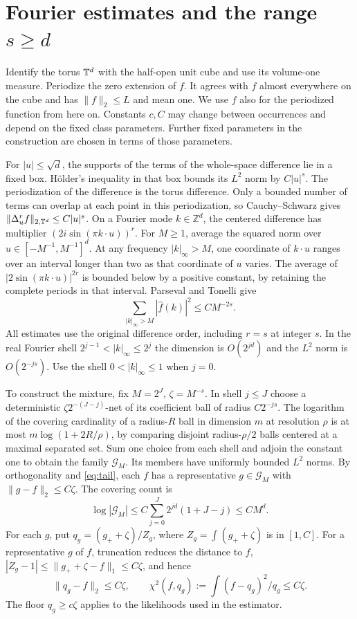 \section{Fourier estimates and the range \texorpdfstring{\(s\ge d\)}{s >= d}}
\label{sec:large-s}

Identify the torus \(\mathbb T^d\) with the half-open unit cube and use
its volume-one measure. Periodize the zero extension of \(f\).
It agrees with \(f\) almost everywhere on the cube and has
\(\|f\|_2\le L\) and mean one. We use \(f\) also for the periodized
function from here on. Constants \(c,C\) may change between
occurrences and depend on the fixed class parameters. Further
fixed parameters in the construction are chosen in terms of those
parameters.

For \(|u|\le\sqrt d\), the supports of the terms of the
whole-space difference lie in a fixed box. Hölder's inequality in
that box bounds its \(L^2\) norm by \(C|u|^s\). The periodization
of the difference is the torus difference. Only a bounded number
of terms can overlap at each point in this periodization, so
Cauchy--Schwarz gives \(\|\Delta_u^r f\|_{2,\mathbb T^d}\le C|u|^s\).
On a Fourier mode \(k\in\mathbb Z^d\), the centered difference
has multiplier \((2i\sin(\pi k\cdot u))^r\). For \(M\ge1\), average
the squared norm over \(u\in[-M^{-1},M^{-1}]^d\). At any
frequency \(|k|_\infty>M\), one coordinate of \(k\cdot u\)
ranges over an interval longer than two as that coordinate of \(u\)
varies. The average of \(|2\sin(\pi k\cdot u)|^{2r}\) is
bounded below by a positive constant, by retaining the complete
periods in that interval. Parseval and Tonelli give
\begin{equation}\label{eq:tail}
   \sum_{|k|_\infty>M} |\widehat f(k)|^2\le C M^{-2s}.
\end{equation}
All estimates use the original difference order, including \(r=s\)
at integer \(s\). In the real Fourier shell
\(2^{j-1}<|k|_\infty\le2^j\) the dimension is \(O(2^{jd})\)
and the \(L^2\) norm is \(O(2^{-js})\). Use the shell
\(0<|k|_\infty\le1\) when \(j=0\).

To construct the mixture, fix \(M=2^J\), \(\zeta=M^{-s}\).
In shell \(j\le J\) choose a deterministic
\(\zeta 2^{-(J-j)}\)-net of its coefficient ball of radius
\(C2^{-js}\). The logarithm of the covering cardinality of a
radius-\(R\) ball in dimension \(m\) at resolution \(\rho\)
is at most \(m\log(1+2R/\rho)\), by comparing disjoint
radius-\(\rho/2\) balls centered at a maximal separated set.
Sum one choice from each shell and adjoin the constant one to
obtain the family \(\mathcal G_M\). Its members have uniformly
bounded \(L^2\) norms. By orthogonality and \eqref{eq:tail},
each \(f\) has a representative \(g\in\mathcal G_M\)
with \(\|g-f\|_2\le C\zeta\). The covering count is
\[
 \log|\mathcal G_M|\le C\sum_{j=0}^J2^{jd}(1+J-j)\le C M^d .
\]
For each \(g\), put \(q_g=(g_++\zeta)/Z_g\),
where \(Z_g=\int(g_++\zeta)\) is in \([1,C]\). For a representative
\(g\) of \(f\), truncation reduces the distance to \(f\),
\(|Z_g-1|\le \|g_++\zeta-f\|_1\le C\zeta\), and hence
\[
 \|q_g-f\|_2\le C\zeta,\qquad
 \chi^2(f,q_g):=\int (f-q_g)^2/q_g\le C\zeta .
\]
The floor \(q_g\ge c\zeta\) applies to the likelihoods used
in the estimator.

